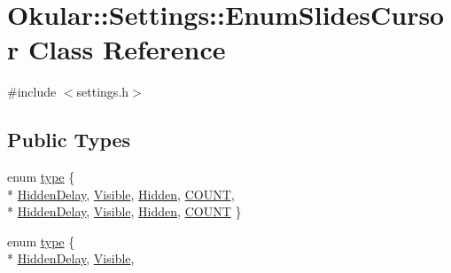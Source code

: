 \hypertarget{classOkular_1_1Settings_1_1EnumSlidesCursor}{\section{Okular\+:\+:Settings\+:\+:Enum\+Slides\+Cursor Class Reference}
\label{classOkular_1_1Settings_1_1EnumSlidesCursor}
}


{\ttfamily \#include $<$settings.\+h$>$}

\subsection*{Public Types}
\begin{DoxyCompactItemize}
\item 
enum \hyperlink{classOkular_1_1Settings_1_1EnumSlidesCursor_a1e2cb729c98ff2274a74500aa64abbc4}{type} \{ \\*
\hyperlink{classOkular_1_1Settings_1_1EnumSlidesCursor_a1e2cb729c98ff2274a74500aa64abbc4ad3624e5ed1cac74d2009cd6a67491ab6}{Hidden\+Delay}, 
\hyperlink{classOkular_1_1Settings_1_1EnumSlidesCursor_a1e2cb729c98ff2274a74500aa64abbc4a1772914ff743ca6ac75814df189e2992}{Visible}, 
\hyperlink{classOkular_1_1Settings_1_1EnumSlidesCursor_a1e2cb729c98ff2274a74500aa64abbc4a117b68ab1af66e116ddf4f78a0e05819}{Hidden}, 
\hyperlink{classOkular_1_1Settings_1_1EnumSlidesCursor_a1e2cb729c98ff2274a74500aa64abbc4ab817f6e9992f88c4b27d68ede4619a2e}{C\+O\+U\+N\+T}, 
\\*
\hyperlink{classOkular_1_1Settings_1_1EnumSlidesCursor_a1e2cb729c98ff2274a74500aa64abbc4ad3624e5ed1cac74d2009cd6a67491ab6}{Hidden\+Delay}, 
\hyperlink{classOkular_1_1Settings_1_1EnumSlidesCursor_a1e2cb729c98ff2274a74500aa64abbc4a1772914ff743ca6ac75814df189e2992}{Visible}, 
\hyperlink{classOkular_1_1Settings_1_1EnumSlidesCursor_a1e2cb729c98ff2274a74500aa64abbc4a117b68ab1af66e116ddf4f78a0e05819}{Hidden}, 
\hyperlink{classOkular_1_1Settings_1_1EnumSlidesCursor_a1e2cb729c98ff2274a74500aa64abbc4ab817f6e9992f88c4b27d68ede4619a2e}{C\+O\+U\+N\+T}
 \}
\item 
enum \hyperlink{classOkular_1_1Settings_1_1EnumSlidesCursor_a1e2cb729c98ff2274a74500aa64abbc4}{type} \{ \\*
\hyperlink{classOkular_1_1Settings_1_1EnumSlidesCursor_a1e2cb729c98ff2274a74500aa64abbc4ad3624e5ed1cac74d2009cd6a67491ab6}{Hidden\+Delay}, 
\hyperlink{classOkular_1_1Settings_1_1EnumSlidesCursor_a1e2cb729c98ff2274a74500aa64abbc4a1772914ff743ca6ac75814df189e2992}{Visible}, 

\end{DoxyCompactItemize}

